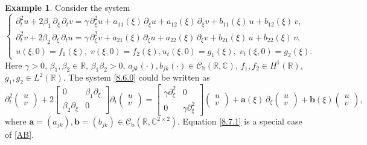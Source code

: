 \documentclass[11pt]{amsart}
\numberwithin{equation}{section}
\newcommand\R{\mathbb R}
\newcommand\C{\mathbb C}
\newcommand{\RR}{{\mathbb R}}
\newcommand{\CC}{{\mathbb C}}
\newcommand{\rmb}{{\mathrm{b}}}
\theoremstyle{remark}
\theoremstyle{definition}
\newtheorem{example}[theorem]{Example}
\newcommand\cC{{\mathcal C}}
\begin{document}
\begin{example}\label{e8.7}
	Consider the system
	\begin{equation}\label{8.7.0}
		\begin{cases}
			\partial_t^2 u + 2\beta_1\,\partial_\xi\,\partial_t v
			= \gamma\,\partial_\xi^2 u + a_{11}(\xi)\,\partial_\xi u + a_{12}(\xi)\,\partial_\xi v
			+ b_{11}(\xi)\,u + b_{12}(\xi)\,v,\\
			\partial_t^2 v + 2\beta_2\,\partial_\xi\,\partial_t u
			= \gamma\,\partial_\xi^2 v + a_{21}(\xi)\,\partial_\xi u + a_{22}(\xi)\,\partial_\xi v
			+ b_{21}(\xi)\,u + b_{22}(\xi)\,v,\\
			u(\xi,0) = f_1(\xi),\; v(\xi,0) = f_2(\xi),
			u_t(\xi,0) = g_1(\xi),\; v_t(\xi,0) = g_2(\xi).
		\end{cases}
	\end{equation}
	Here $\gamma > 0$, $\beta_1, \beta_2 \in \R$, $\beta_1\beta_2 > 0$,
	$a_{jk}(\cdot), b_{jk}(\cdot) \in \cC_\rmb(\RR,\CC)$,
	$f_1, f_2 \in H^1(\R)$, $g_1, g_2 \in L^2(\R)$.
	The system \eqref{8.6.0} could be written as
	\begin{equation}\label{8.7.1}
		\partial_t^2\begin{pmatrix}u\\v\end{pmatrix}
		+ 2\begin{bmatrix}0 & \beta_1\partial_\xi\\\beta_2\partial_\xi & 0\end{bmatrix}
		\partial_t\begin{pmatrix}u\\v\end{pmatrix}
		= \begin{bmatrix}\gamma\partial_\xi^2 & 0\\ 0 & \gamma\partial_\xi^2\end{bmatrix}
		\begin{pmatrix}u\\v\end{pmatrix}
		+ \mathbf{a}(\xi)\,\partial_\xi\begin{pmatrix}u\\v\end{pmatrix}
		+ \mathbf{b}(\xi)\begin{pmatrix}u\\v\end{pmatrix},
	\end{equation}
	where $\mathbf{a} = (a_{jk}),
	\mathbf{b} = (b_{jk}) \in \mathcal{C}_\rmb(\R,\C^{2\times2})$.
	Equation \eqref{8.7.1} is a special case of \eqref{AB}.

\end{example}
\end{document}
